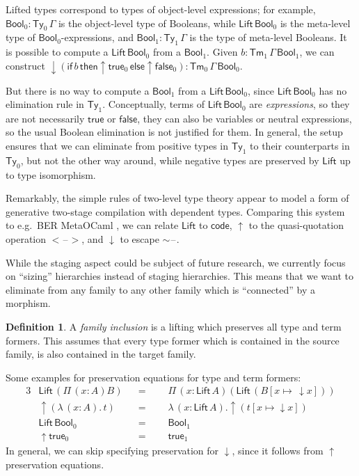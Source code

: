 \documentclass[a4paper,UKenglish,cleveref, autoref, thm-restate]{lipics-v2021}
\theoremstyle{remark}
\theoremstyle{definition}
\newtheorem{mydefinition}{Definition}
\newcommand{\Ty}{\mathsf{Ty}}
\newcommand{\Tm}{\mathsf{Tm}}
\newcommand{\blank}{\mathord{\hspace{1pt}\text{--}\hspace{1pt}}}
\newcommand{\Bool}{\mathsf{Bool}}
\newcommand{\true}{\mathsf{true}}
\newcommand{\false}{\mathsf{false}}
\newcommand{\up}{\uparrow}
\newcommand{\down}{\downarrow}
\newcommand{\Lift}{\mathsf{Lift}}
\begin{document}
Lifted types correspond to types of object-level expressions; for
example, $\Bool_0 : \Ty_0\,\Gamma$ is the object-level type of Booleans, while
$\Lift\,\Bool_0$ is the meta-level type of $\Bool_0$-expressions, and $\Bool_1 :
\Ty_1\,\Gamma$ is the type of meta-level Booleans. It is possible to compute a
$\Lift\,\Bool_0$ from a $\Bool_1$. Given $b : \Tm_1\,\Gamma\,\Bool_1$, we can
construct
$\down(\mathsf{if}\,b\,\mathsf{then}\up\!\true_0\,\mathsf{else}\up\!\false_0) :
\Tm_0\,\Gamma\,\Bool_0$.

But there is no way to compute a $\Bool_1$ from a $\Lift\,\Bool_0$, since
$\Lift\,\Bool_0$ has no elimination rule in $\Ty_1$. Conceptually, terms
of $\Lift\,\Bool_0$ are \emph{expressions}, so they are not necessarily $\true$ or
$\false$, they can also be variables or neutral expressions, so the usual
Boolean elimination is not justified for them. In general, the setup ensures that
we can eliminate from positive types in $\Ty_1$ to their counterparts in
$\Ty_0$, but not the other way around, while negative types are preserved by
$\Lift$ up to type isomorphism.

Remarkably, the simple rules of two-level type theory appear to model a form of
generative two-stage compilation with dependent types. Comparing this system to
e.g.\ BER MetaOCaml \cite{kiselyov14metaocaml}, we can relate $\Lift$ to $\mathsf{code}$, $\up$
to the quasi-quotation operation $<\!\blank\!>$, and $\down$ to escape
$\sim\!\blank$.

While the staging aspect could be subject of future research, we currently focus
on ``sizing'' hierarchies instead of staging hierarchies. This means that we
want to eliminate from any family to any other family which is ``connected'' by
a morphism.

\begin{mydefinition}\label{def:inclusion}
A \emph{family inclusion} is a lifting which preserves all type and term
formers. This assumes that every type former which is contained in the source
family, is also contained in the target family.
\end{mydefinition}

\noindent Some examples for preservation equations for type and term formers:
\begin{alignat*}{3}
  & \Lift\,(\Pi\,(x : A) B)   && =\,\,\,\,&& \Pi\,(x : \Lift\,A)(\Lift\, (B[x \mapsto\,\down\!x]))\\
  & \up(\lambda\,(x : A).\,t) && =&& \lambda\,(x : \Lift\,A).\up(t[x\mapsto\down\!x])\\
  & \Lift\,\Bool_0            && =&& \Bool_1\\
  & \up\true_0                && =&& \true_1
\end{alignat*}
In general, we can skip specifying preservation for $\down$, since it follows from $\up$ preservation
equations.
\end{document}
